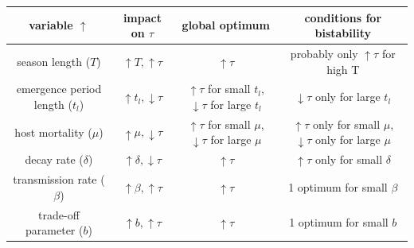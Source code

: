 \documentclass{article}
\begin{document}
\begin{center}
\begin{tabular}{ |c|c|c|c| }
\hline
variable $\uparrow$ & impact on $\tau$ & global optimum & conditions for bistability \\
\hline
season length ($T$) &  $\uparrow T,  \uparrow \tau$ & $\uparrow \tau$ & probably only $\uparrow \tau$ for high T\\
emergence period length ($t_{l}$) & $\uparrow t_{l},  \downarrow \tau$ & $\uparrow \tau$ for small $t_{l}$, $\downarrow \tau$ for large $t_{l}$ & $\downarrow \tau$ only for large $t_{l}$\\
host mortality ($\mu$) & $\uparrow \mu,  \downarrow \tau$ & $\uparrow \tau$ for small $\mu$, $\downarrow \tau$ for large $\mu$ & $\uparrow \tau$ only for small $\mu$,  $\downarrow \tau$ only for large $\mu$  \\
decay rate ($\delta$) & $\uparrow \delta, \downarrow \tau $ & $ \uparrow \tau$ & $ \uparrow \tau$ only for small $\delta$\\
transmission rate ($\beta$) & $\uparrow \beta, \uparrow \tau$ & $\uparrow \tau$ & 1 optimum for small $\beta$\\
trade-off parameter ($b$) & $\uparrow b, \uparrow \tau$ & $\uparrow \tau$ & 1 optimum for small $b$\\
\hline
\end{tabular}
\end{center}
\end{document}
